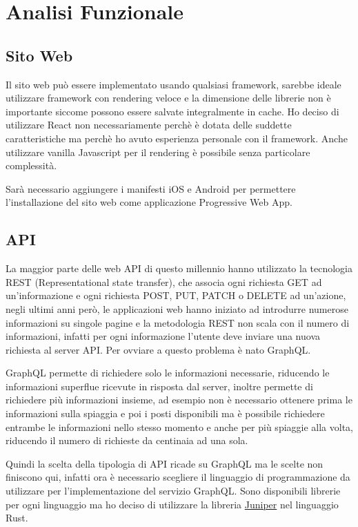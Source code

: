\section{Analisi Funzionale}%
\label{sec:analisi_funzionale}

\subsection{Sito Web}%
\label{sub:sito_web}

Il sito web pu\`o essere implementato usando qualsiasi framework, sarebbe ideale utilizzare framework con rendering veloce e la dimensione delle librerie non \`e importante siccome possono essere salvate integralmente in cache. Ho deciso di utilizzare React non necessariamente perch\`e \`e dotata delle suddette caratteristiche ma perch\`e ho avuto esperienza personale con il framework. Anche utilizzare vanilla Javascript per il rendering \`e possibile senza particolare complessit\`a.

Sar\`a necessario aggiungere i manifesti iOS e Android per permettere l'installazione del sito web come applicazione Progressive Web App.

\subsection{API}%
\label{sub:api}

La maggior parte delle web API di questo millennio hanno utilizzato la tecnologia REST (Representational state transfer), che associa ogni richiesta GET ad un'informazione e ogni richiesta POST, PUT, PATCH o DELETE ad un'azione, negli ultimi anni per\`o, le applicazioni web hanno iniziato ad introdurre numerose informazioni su singole pagine e la metodologia REST non scala con il numero di informazioni, infatti per ogni informazione l'utente deve inviare una nuova richiesta al server API\@. Per ovviare a questo problema \`e nato GraphQL\@.

GraphQL permette di richiedere solo le informazioni necessarie, riducendo le informazioni superflue ricevute in risposta dal server, inoltre permette di richiedere pi\`u informazioni insieme, ad esempio non \`e necessario ottenere prima le informazioni sulla spiaggia e poi i posti disponibili ma \`e possibile richiedere entrambe le informazioni nello stesso momento e anche per pi\`u spiaggie alla volta, riducendo il numero di richieste da centinaia ad una sola. %

Quindi la scelta della tipologia di API ricade su GraphQL ma le scelte non finiscono qui, infatti ora \`e necessario scegliere il linguaggio di programmazione da utilizzare per l'implementazione del servizio GraphQL\@. Sono disponibili librerie per ogni linguaggio ma ho deciso di utilizzare la libreria \href{https://github.com/graphql-rust/juniper}{Juniper} nel linguaggio Rust.

